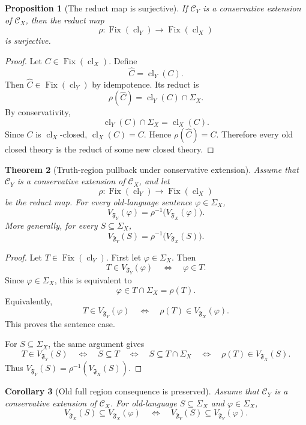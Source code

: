 \documentclass[11pt]{amsart}
\numberwithin{equation}{section}
\theoremstyle{plain}
\newtheorem{theorem}{Theorem}[section]
\newtheorem{proposition}[theorem]{Proposition}
\newtheorem{corollary}[theorem]{Corollary}
\theoremstyle{definition}
\theoremstyle{remark}
\newcommand{\Cl}{\operatorname{cl}}
\newcommand{\Fix}{\operatorname{Fix}}
\newcommand{\C}{\mathcal C}
\newcommand{\F}{\mathfrak F}
\newcommand{\Sig}{\Sigma}
\begin{document}
\begin{proposition}[The reduct map is surjective]
\label{prop:reduct-map-surjective}
If \(\C_Y\) is a conservative extension of \(\C_X\), then the reduct map
\[
  \rho:\Fix(\Cl_Y)\to\Fix(\Cl_X)
\]
is surjective.
\end{proposition}

\begin{proof}
Let \(C\in\Fix(\Cl_X)\). Define
\[
  \widehat C=\Cl_Y(C).
\]
Then \(\widehat C\in\Fix(\Cl_Y)\) by idempotence. Its reduct is
\[
  \rho(\widehat C)=\Cl_Y(C)\cap\Sig_X.
\]
By conservativity,
\[
  \Cl_Y(C)\cap\Sig_X=\Cl_X(C).
\]
Since \(C\) is \(\Cl_X\)-closed, \(\Cl_X(C)=C\). Hence \(\rho(\widehat C)=C\). Therefore every old closed theory is the reduct of some new closed theory.
\end{proof}

\begin{theorem}[Truth-region pullback under conservative extension]
\label{thm:old-truth-regions-pull-back-conservative-extension}
Assume that \(\C_Y\) is a conservative extension of \(\C_X\), and let
\[
  \rho:\Fix(\Cl_Y)\to\Fix(\Cl_X)
\]
be the reduct map. For every old-language sentence \(\varphi\in\Sig_X\),
\[
  V_{\F_Y}(\varphi)=\rho^{-1}\bigl(V_{\F_X}(\varphi)\bigr).
\]
More generally, for every \(S\subseteq\Sig_X\),
\[
  V_{\F_Y}(S)=\rho^{-1}\bigl(V_{\F_X}(S)\bigr).
\]
\end{theorem}

\begin{proof}
Let \(T\in\Fix(\Cl_Y)\). First let \(\varphi\in\Sig_X\). Then
\[
  T\in V_{\F_Y}(\varphi)
  \quad\Longleftrightarrow\quad
  \varphi\in T.
\]
Since \(\varphi\in\Sig_X\), this is equivalent to
\[
  \varphi\in T\cap\Sig_X=\rho(T).
\]
Equivalently,
\[
  T\in V_{\F_Y}(\varphi)
  \quad\Longleftrightarrow\quad
  \rho(T)\in V_{\F_X}(\varphi).
\]
This proves the sentence case.

For \(S\subseteq\Sig_X\), the same argument gives
\[
  T\in V_{\F_Y}(S)
  \quad\Longleftrightarrow\quad
  S\subseteq T
  \quad\Longleftrightarrow\quad
  S\subseteq T\cap\Sig_X
  \quad\Longleftrightarrow\quad
  \rho(T)\in V_{\F_X}(S).
\]
Thus \(V_{\F_Y}(S)=\rho^{-1}(V_{\F_X}(S))\).
\end{proof}

\begin{corollary}[Old full region consequence is preserved]
\label{cor:old-full-region-consequence-preserved}
Assume that \(\C_Y\) is a conservative extension of \(\C_X\). For old-language \(S\subseteq\Sig_X\) and \(\varphi\in\Sig_X\),
\[
  V_{\F_X}(S)\subseteq V_{\F_X}(\varphi)
  \quad\Longleftrightarrow\quad
  V_{\F_Y}(S)\subseteq V_{\F_Y}(\varphi).
\]
\end{corollary}
\end{document}
